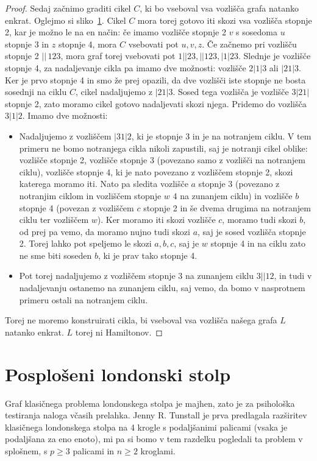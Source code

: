 \documentclass[12pt,a4paper]{amsart}
\theoremstyle{definition} %
\theoremstyle{plain} %
\begin{document}
\begin{proof}
    Sedaj začnimo graditi cikel $C$, ki bo vseboval vsa vozlišča grafa natanko enkrat. Oglejmo si sliko~\ref{}.
    Cikel $C$ mora torej gotovo iti skozi vsa vozlišča stopnje 2, kar je možno le na en način: če imamo vozlišče stopnje 2 $v$ s sosedoma $u$ stopnje 3 in $z$ stopnje 4, mora $C$ vsebovati pot $u,v,z$.
    Če začnemo pri vozlišču stopnje 2 $||\,123$, mora graf torej vsebovati pot $1||23, ||123, |1|23$. Slednje je vozlišče stopnje 4, za nadaljevanje cikla pa imamo dve možnosti: vozlišče $2|1|3$ ali $|21|3$. Ker je prvo stopnje 4 in smo že prej opazili, da dve vozlišči iste stopnje ne bosta sosednji na ciklu $C$, cikel nadaljujemo z $|21|3$. Sosed tega vozlišča je vozlišče $3|21|$ stopnje 2, zato moramo cikel gotovo nadaljevati skozi njega. Pridemo do vozlišča $3|1|2$. Imamo dve možnosti: 
    \begin{itemize}[label={-}]
        \item Nadaljujemo z vozliščem $|31|2$, ki je stopnje 3 in je na notranjem ciklu. V tem primeru ne bomo notranjega cikla nikoli zapustili, saj je notranji cikel oblike: vozlišče stopnje 2, vozlišče stopnje 3 (povezano samo z vozlišči na notranjem ciklu), vozlišče stopnje 4, ki je nato povezano z vozliščem stopnje 2, skozi katerega moramo iti. Nato pa sledita vozlišče $a$ stopnje 3 (povezano z notranjim ciklom in vozliščem stopnje $w$ 4 na zunanjem ciklu) in vozlišče $b$ stopnje 4 (povezan z vozliščem $c$ stopnje 2 in še dvema drugima na notranjem ciklu ter vozliščem $w$). Ker moramo iti skozi vozlišče $c$, moramo tudi skozi $b$, od prej pa vemo, da moramo nujno tudi skozi $a$, saj je sosed vozlišča stopnje 2. Torej lahko pot speljemo le skozi $a,b,c$, saj je $w$ stopnje 4 in na ciklu zato ne sme biti soseden $b$, ki je prav tako stopnje 4.
        \item Pot torej nadaljujemo z vozliščem stopnje 3 na zunanjem ciklu $3||12$, in tudi v nadaljevanju ostanemo na zunanjem ciklu, saj vemo, da bomo v nasprotnem primeru ostali na notranjem ciklu.
    \end{itemize}
    Torej ne moremo konstruirati cikla, bi vseboval vsa vozlišča našega grafa $L$ natanko enkrat. $L$ torej ni Hamiltonov.
    \qedhere
\end{proof}

\section{Posplošeni londonski stolp}
Graf klasičnega problema londonskega stolpa je majhen, zato je za psihološka testiranja naloga včasih prelahka. 
Jenny R. Tunstall je prva predlagala razširitev klasičnega londonskega stolpa na 4 krogle s podaljšanimi palicami (vsaka je podaljšana za eno enoto), mi pa si bomo v tem razdelku pogledali ta problem v splošnem, s $p \geq 3$ palicami in $n \geq 2$ kroglami.
\end{document}
